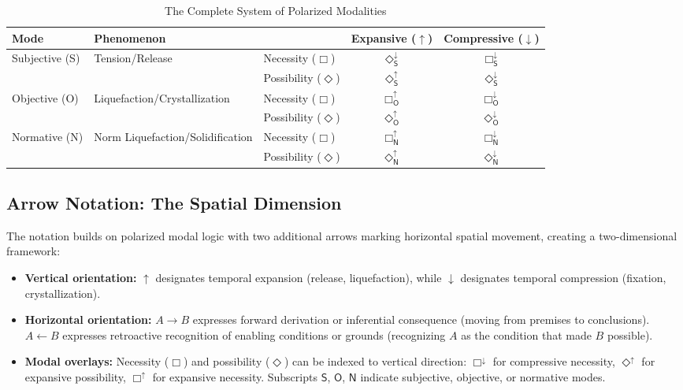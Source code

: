 \documentclass[12pt]{book}
\newcommand{\SBoxDown}{\Box_{\mathsf{S}}^{\downarrow}}
\newcommand{\SDiaUp}{\Diamond_{\mathsf{S}}^{\uparrow}}
\newcommand{\SDiaDown}{\Diamond_{\mathsf{S}}^{\downarrow}}
\newcommand{\OBoxUp}{\Box_{\mathsf{O}}^{\uparrow}}
\newcommand{\OBoxDown}{\Box_{\mathsf{O}}^{\downarrow}}
\newcommand{\ODiaUp}{\Diamond_{\mathsf{O}}^{\uparrow}}
\newcommand{\ODiaDown}{\Diamond_{\mathsf{O}}^{\downarrow}}
\newcommand{\NBoxUp}{\Box_{\mathsf{N}}^{\uparrow}}
\newcommand{\NBoxDown}{\Box_{\mathsf{N}}^{\downarrow}}
\newcommand{\NDiaUp}{\Diamond_{\mathsf{N}}^{\uparrow}}
\newcommand{\NDiaDown}{\Diamond_{\mathsf{N}}^{\downarrow}}
\begin{document}
\begin{table}[H]
 \centering
 \begin{tabular}{lllcc}
\toprule
Mode & Phenomenon & & Expansive ($\uparrow$) & Compressive ($\downarrow$) \\
\midrule
\multirow{2}{*}{Subjective (S)} & \multirow{2}{*}{Tension/Release} & Necessity ($\Box$) & $\SDiaDown$ & $\SBoxDown$ \\
& & Possibility ($\Diamond$) & $\SDiaUp$ & $\SDiaDown$ \\
\midrule
\multirow{2}{*}{Objective (O)} & \multirow{2}{*}{Liquefaction/Crystallization} & Necessity ($\Box$) & $\OBoxUp$ & $\OBoxDown$ \\
& & Possibility ($\Diamond$) & $\ODiaUp$ & $\ODiaDown$ \\
\midrule
\multirow{2}{*}{Normative (N)} & \multirow{2}{*}{Norm Liquefaction/Solidification} & Necessity ($\Box$) & $\NBoxUp$ & $\NBoxDown$ \\
& & Possibility ($\Diamond$) & $\NDiaUp$ & $\NDiaDown$ \\
\bottomrule
\end{tabular}
\caption{The Complete System of Polarized Modalities}
\label{tab:complete_modalities}
\end{table}

\subsection{Arrow Notation: The Spatial Dimension}

The notation builds on polarized modal logic with two additional arrows marking horizontal spatial movement, creating a two-dimensional framework:

\begin{itemize}
  \item \textbf{Vertical orientation:} $\uparrow$ designates temporal expansion (release, liquefaction), while $\downarrow$ designates temporal compression (fixation, crystallization).
  
  \item \textbf{Horizontal orientation:} $A \rightarrow B$ expresses forward derivation or inferential consequence (moving from premises to conclusions). $A \leftarrow B$ expresses retroactive recognition of enabling conditions or grounds (recognizing $A$ as the condition that made $B$ possible).
  
  \item \textbf{Modal overlays:} Necessity ($\Box$) and possibility ($\Diamond$) can be indexed to vertical direction: $\Box^{\downarrow}$ for compressive necessity, $\Diamond^{\uparrow}$ for expansive possibility, $\Box^{\uparrow}$ for expansive necessity. Subscripts $\mathsf{S}$, $\mathsf{O}$, $\mathsf{N}$ indicate subjective, objective, or normative modes.
\end{itemize}
\end{document}
